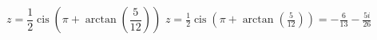 { $z = \dfrac{1}{2}\operatorname{cis}\left(\pi+\arctan\left(\dfrac{5}{12}\right)\right)$ \label{rectcomplast}}
{ $z = \frac{1}{2}\operatorname{cis}\left(\pi+\arctan\left(\frac{5}{12}\right)\right) = -\frac{6}{13} - \frac{5i}{26}$}
